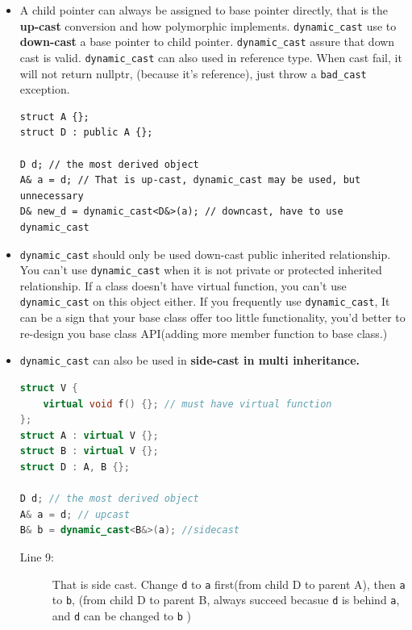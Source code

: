 \documentclass[a4paper,11pt,twoside]{book}
\begin{document}
\begin{itemize}
	\item A child pointer can always be assigned to base pointer directly, that is the \textbf{up-cast} conversion and how polymorphic implements. \texttt{dynamic\_cast} use to \textbf{down-cast} a base pointer to child pointer. \texttt{dynamic\_cast} assure that down cast is valid. \texttt{dynamic\_cast} can also used in reference type. When cast fail, it will not return nullptr, (because it's reference), just throw a \texttt{bad\_cast} exception.
	
\begin{lstlisting}
struct A {};
struct D : public A {};

D d; // the most derived object
A& a = d; // That is up-cast, dynamic_cast may be used, but unnecessary
D& new_d = dynamic_cast<D&>(a); // downcast, have to use dynamic_cast 
\end{lstlisting}	
	
	\item \texttt{dynamic\_cast} should only be used down-cast public inherited relationship. You can't use \texttt{dynamic\_cast} when it is not private or protected inherited relationship. If a class doesn't have virtual function, you can't use \texttt{dynamic\_cast} on this object either. If you frequently use \texttt{dynamic\_cast}, It can be a sign that your base class offer too little functionality, you'd better to re-design you base class API(adding more member function to base class.)
	
	\item \texttt{dynamic\_cast} can also be used in \textbf{side-cast in multi inheritance. }
\begin{lstlisting}[frame=single, language=c++, mathescape=true]
struct V {
	virtual void f() {}; // must have virtual function
};
struct A : virtual V {};
struct B : virtual V {};
struct D : A, B {};
	
D d; // the most derived object
A& a = d; // upcast 
B& b = dynamic_cast<B&>(a); //sidecast
	\end{lstlisting}
\begin{description}
	
	\item[Line 9:] That is side cast. Change \texttt{d} to \texttt{a} first(from child D to parent A), then \texttt{a} to \texttt{b}, (from child D to parent B, always succeed becasue \texttt{d} is behind \texttt{a}, and \texttt{d} can be changed to \texttt{b} )
	
\end{description}
	

\end{itemize}
\end{document}
